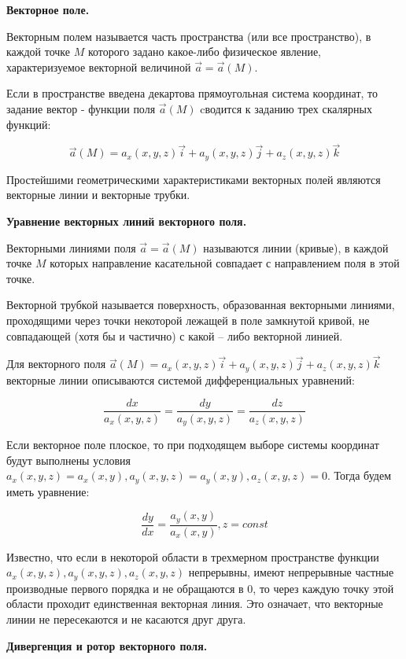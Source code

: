 
\begin{center}
\textbf{Векторное поле.}
\end{center}

Векторным полем называется часть пространства (или все пространство), в каждой точке $M$ которого задано какое-либо физическое явление, характеризуемое векторной величиной $\vec{a} = \vec{a}(M)$.

Если в пространстве введена декартова прямоугольная система координат, то задание вектор - функции поля $\vec{a}(M)$ cводится к заданию трех скалярных функций:

$$\vec{a}(M)=a_x(x,y,z)\vec{i}+ a_y(x,y,z)\vec{j} + a_z(x,y,z)\vec{k}$$

Простейшими геометрическими характеристиками векторных полей являются векторные линии и векторные трубки.

\begin{center}
\textbf{Уравнение векторных линий векторного поля.}
\end{center}

Векторными линиями поля $\vec{a} = \vec{a}(M)$ называются линии (кривые), в каждой точке $M$ которых направление касательной совпадает с направлением поля в этой точке.

Векторной трубкой называется поверхность, образованная векторными линиями, проходящими через точки некоторой лежащей в поле замкнутой кривой, не совпадающей (хотя бы и частично) с какой – либо векторной линией.

Для векторного поля $\vec{a}(M)=a_x(x,y,z)\vec{i}+ a_y(x,y,z)\vec{j} + a_z(x,y,z)\vec{k}$ векторные линии описываются системой дифференциальных уравнений:

$$\frac{dx}{a_x(x,y,z)}=\frac{dy}{a_y(x,y,z)}=\frac{dz}{a_z(x,y,z)}$$

Если векторное поле плоское, то при подходящем выборе системы
координат будут выполнены условия $a_x(x,y,z)=a_x(x,y), a_y(x,y,z)=a_y(x,y), a_z(x,y,z)=0$. Тогда будем иметь уравнение:


$$\frac{dy}{dx} = \frac{a_y(x,y)}{a_x(x,y)}, z=const$$	


Известно, что если в некоторой области в трехмерном пространстве
функции $a_x(x,y,z), a_y(x,y,z), a_z(x,y,z)$ непрерывны, имеют непрерывные частные производные первого
порядка и не обращаются в 0, то через каждую точку этой области проходит единственная векторная линия. Это означает, что векторные
линии не пересекаются и не касаются друг друга.

\begin{center}
\textbf{ Дивергенция и ротор векторного поля.}
\end{center}

